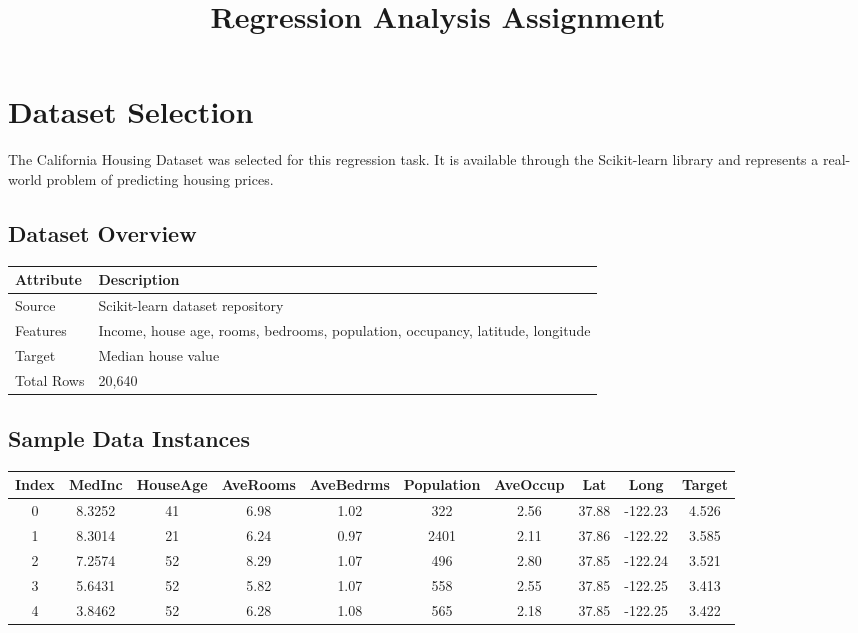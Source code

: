 \documentclass[12pt]{article}
\title{\textbf{Regression Analysis Assignment}}
\date{}
\begin{document}
\maketitle

\section{Dataset Selection}

The California Housing Dataset was selected for this regression task. It is available through the Scikit-learn library and represents a real-world problem of predicting housing prices.

\subsection*{Dataset Overview}

\begin{center}
\renewcommand{\arraystretch}{1.5}
\setlength{\tabcolsep}{10pt}
\begin{tabular}{|m{5cm}|m{8cm}|}
\hline
\textbf{Attribute} & \textbf{Description} \\
\hline
Source & Scikit-learn dataset repository \\
\hline
Features & Income, house age, rooms, bedrooms, population, occupancy, latitude, longitude \\
\hline
Target & Median house value \\
\hline
Total Rows & 20,640 \\
\hline
\end{tabular}
\end{center}

\subsection{Sample Data Instances}

\begin{center}
\renewcommand{\arraystretch}{1.6}
\setlength{\tabcolsep}{2.8pt}
\begin{tabular}{|c|c|c|c|c|c|c|c|c|c|}
\hline
\textbf{Index} & \textbf{MedInc} & \textbf{HouseAge} & \textbf{AveRooms} & \textbf{AveBedrms} & \textbf{Population} & \textbf{AveOccup} & \textbf{Lat} & \textbf{Long} & \textbf{Target} \\
\hline
0 & 8.3252 & 41 & 6.98 & 1.02 & 322 & 2.56 & 37.88 & -122.23 & 4.526 \\
\hline
1 & 8.3014 & 21 & 6.24 & 0.97 & 2401 & 2.11 & 37.86 & -122.22 & 3.585 \\
\hline
2 & 7.2574 & 52 & 8.29 & 1.07 & 496 & 2.80 & 37.85 & -122.24 & 3.521 \\
\hline
3 & 5.6431 & 52 & 5.82 & 1.07 & 558 & 2.55 & 37.85 & -122.25 & 3.413 \\
\hline
4 & 3.8462 & 52 & 6.28 & 1.08 & 565 & 2.18 & 37.85 & -122.25 & 3.422 \\
\hline
\end{tabular}
\end{center}
\end{document}
